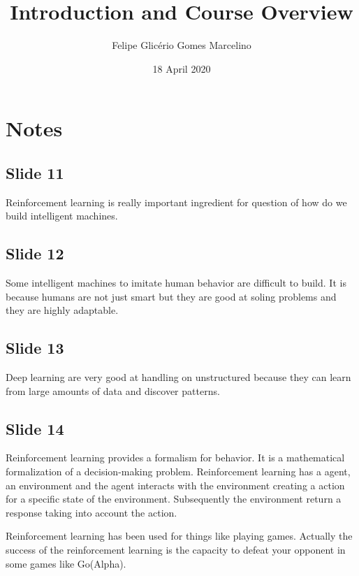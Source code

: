 \documentclass{article}
\begin{document}
\title{Introduction and Course Overview}
\author{Felipe Glicério Gomes Marcelino}
\date{18 April 2020}
\maketitle

\section{Notes}

\subsection*{Slide 11}
\par Reinforcement learning is really important ingredient for question of how do we build intelligent machines.

\subsection*{Slide 12}
\par Some intelligent machines to imitate human behavior are difficult to build. It is because humans are not just smart
but they are good at soling problems and they are highly adaptable.

\subsection*{Slide 13}
\par Deep learning are very good at handling on unstructured because they can learn from large amounts of data and
discover patterns.

\subsection*{Slide 14}
\par Reinforcement learning provides a formalism for behavior. It is a mathematical formalization of a decision-making
problem. Reinforcement learning has a agent, an environment and the agent interacts with the environment creating a
action for a specific state of the environment. Subsequently the environment return a response taking into account the
action. 
\par Reinforcement learning has been used for things like playing games. Actually the success of the reinforcement
learning is the capacity to defeat your opponent in some games like Go(Alpha).
\end{document}

